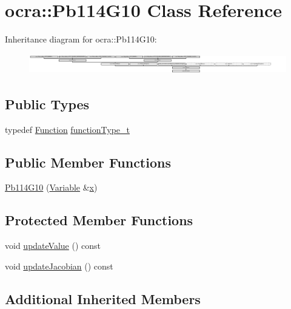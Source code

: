 \hypertarget{classocra_1_1Pb114G10}{}\section{ocra\+:\+:Pb114\+G10 Class Reference}
\label{classocra_1_1Pb114G10}
Inheritance diagram for ocra\+:\+:Pb114\+G10\+:\begin{figure}[H]
\begin{center}
\leavevmode
\includegraphics[height=0.901771cm]{dd/d93/classocra_1_1Pb114G10}
\end{center}
\end{figure}
\subsection*{Public Types}
\begin{DoxyCompactItemize}
\item 
typedef \hyperlink{classocra_1_1Function}{Function} \hyperlink{classocra_1_1Pb114G10_abefa27aa6362ee95d59c39654bd7ab2f}{function\+Type\+\_\+t}
\end{DoxyCompactItemize}
\subsection*{Public Member Functions}
\begin{DoxyCompactItemize}
\item 
\hyperlink{classocra_1_1Pb114G10_a3a99a728ba252d05dd70b24d39dfb643}{Pb114\+G10} (\hyperlink{classocra_1_1Variable}{Variable} \&\hyperlink{classocra_1_1Function_a28825886d1f149c87b112ec2ec1dd486}{x})
\end{DoxyCompactItemize}
\subsection*{Protected Member Functions}
\begin{DoxyCompactItemize}
\item 
void \hyperlink{classocra_1_1Pb114G10_a8bdb81b11c37543a833cd09b199d9a1c}{update\+Value} () const
\item 
void \hyperlink{classocra_1_1Pb114G10_aab79b71d5356edb0cd551158bb9bb93b}{update\+Jacobian} () const
\end{DoxyCompactItemize}
\subsection*{Additional Inherited Members}


